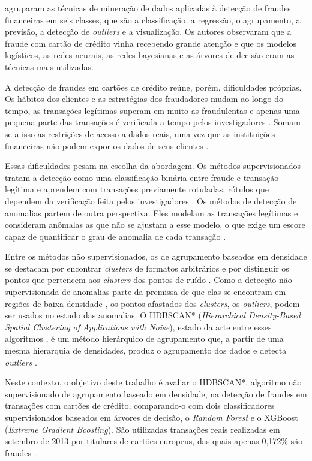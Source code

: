 \documentclass{uflamon}          %
\begin{document}
 agruparam as técnicas de mineração de dados aplicadas à detecção de fraudes financeiras em seis classes, que são a classificação, a regressão, o agrupamento, a previsão, a detecção de \textit{outliers} e a visualização. Os autores observaram que a fraude com cartão de crédito vinha recebendo grande atenção e que os modelos logísticos, as redes neurais, as redes bayesianas e as árvores de decisão eram as técnicas mais utilizadas.

A detecção de fraudes em cartões de crédito reúne, porém, dificuldades próprias. Os hábitos dos clientes e as estratégias dos fraudadores mudam ao longo do tempo, as transações legítimas superam em muito as fraudulentas e apenas uma pequena parte das transações é verificada a tempo pelos investigadores \cite{dalpozzolo2018}. Somam-se a isso as restrições de acesso a dados reais, uma vez que as instituições financeiras não podem expor os dados de seus clientes \cite{sulaiman2022}.

Essas dificuldades pesam na escolha da abordagem. Os métodos supervisionados tratam a detecção como uma classificação binária entre fraude e transação legítima e aprendem com transações previamente rotuladas, rótulos que dependem da verificação feita pelos investigadores \cite{jurgovsky2018, dalpozzolo2018}. Os métodos de detecção de anomalias partem de outra perspectiva. Eles modelam as transações legítimas e consideram anômalas as que não se ajustam a esse modelo, o que exige um escore capaz de quantificar o grau de anomalia de cada transação \cite{jurgovsky2018}.

Entre os métodos não supervisionados, os de agrupamento baseados em densidade se destacam por encontrar \textit{clusters} de formatos arbitrários e por distinguir os pontos que pertencem aos \textit{clusters} dos pontos de ruído \cite{neto2021}. Como a detecção não supervisionada de anomalias parte da premissa de que elas se encontram em regiões de baixa densidade \cite{ghosh2024}, os pontos afastados dos \textit{clusters}, os \textit{outliers}, podem ser usados no estudo das anomalias. O HDBSCAN* (\textit{Hierarchical Density-Based Spatial Clustering of Applications with Noise}), estado da arte entre esses algoritmos \cite{neto2021}, é um método hierárquico de agrupamento que, a partir de uma mesma hierarquia de densidades, produz o agrupamento dos dados e detecta \textit{outliers} \cite{campello2015}.

Neste contexto, o objetivo deste trabalho é avaliar o HDBSCAN*, algoritmo não supervisionado de agrupamento baseado em densidade, na detecção de fraudes em transações com cartões de crédito, comparando-o com dois classificadores supervisionados baseados em árvores de decisão, o \textit{Random Forest} e o XGBoost (\textit{Extreme Gradient Boosting}). São utilizadas transações reais realizadas em setembro de 2013 por titulares de cartões europeus, das quais apenas 0,172\% são fraudes \cite{kaggle2018}.
\end{document}
